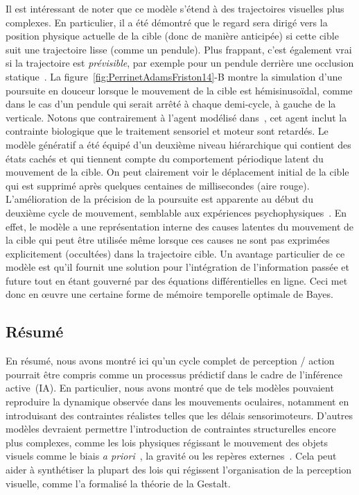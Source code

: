 Il est intéressant de noter que ce modèle s'étend à des trajectoires
visuelles plus complexes. En particulier, il a été démontré que le
regard sera dirigé vers la position physique actuelle de la cible (donc
de manière anticipée) si cette cible suit une trajectoire lisse
(comme un pendule). Plus frappant, c'est également vrai si la
trajectoire est \emph{prévisible}, par exemple pour un pendule derrière
une occlusion statique~\citep{Barnes91,Adams12}. La figure~\ref{fig:PerrinetAdamsFriston14}-B montre la simulation d'une poursuite
en douceur lorsque le mouvement de la cible est hémisinusoïdal, comme
dans le cas d'un pendule qui serait arrêté à chaque demi-cycle, à gauche
de la verticale. Notons que contrairement à l'agent modélisé dans~\citep{Adams12}, cet agent inclut la contrainte biologique
que le traitement sensoriel et moteur sont retardés. Le modèle génératif a
été équipé d'un deuxième niveau hiérarchique qui contient des états
cachés et qui tiennent compte du comportement périodique latent du
mouvement de la cible. On peut clairement voir le déplacement initial de
la cible qui est supprimé après quelques centaines de millisecondes
(aire rouge). L'amélioration de la précision de la poursuite
est apparente au début du deuxième cycle de mouvement, semblable aux
expériences psychophysiques~\citep{Barnes91}. En effet, le
modèle a une représentation interne des causes latentes du mouvement de
la cible qui peut être utilisée même lorsque ces causes ne sont pas
exprimées explicitement (occultées) dans la trajectoire cible. Un
avantage particulier de ce modèle est qu'il fournit une solution pour
l'intégration de l'information passée et future tout en étant gouverné
par des équations différentielles en ligne. Ceci met donc en œuvre une
certaine forme de mémoire temporelle optimale de Bayes.

\subsection{Résumé}
En résumé, nous avons montré ici qu'un cycle complet de perception
/ action pourrait être compris comme un processus prédictif
dans le cadre de l'inférence active~(IA). En particulier, nous avons
montré que de tels modèles pouvaient reproduire la dynamique observée
dans les mouvements oculaires, notamment en introduisant des contraintes
réalistes telles que les délais sensorimoteurs. D'autres modèles
devraient permettre l'introduction de contraintes structurelles encore
plus complexes, comme les lois physiques régissant le mouvement des
objets visuels comme le biais \emph{a priori}~\citep{Damasse18}, la
gravité ou les repères externes~\citep{Kowler14}. Cela peut aider à
synthétiser la plupart des lois qui régissent l'organisation de la
perception visuelle, comme l'a formalisé la théorie de la Gestalt.

